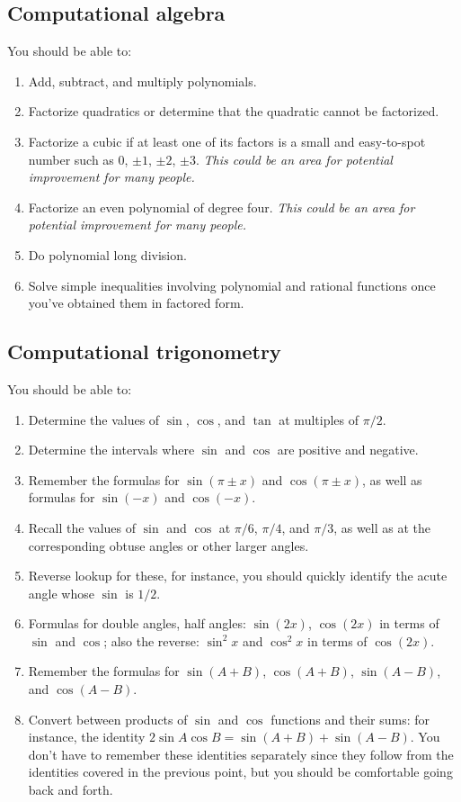 \documentclass[10pt]{amsart}
\begin{document}
\subsection{Computational algebra}

You should be able to:

\begin{enumerate}
\item Add, subtract, and multiply polynomials.
\item Factorize quadratics or determine that the quadratic cannot be
  factorized.
\item Factorize a cubic if at least one of its factors is a small and
  easy-to-spot number such as $0$, $\pm 1$, $\pm 2$, $\pm 3$. {\em
  This could be an area for potential improvement for many people.}
\item Factorize an even polynomial of degree four. {\em This could be
  an area for potential improvement for many people.}
\item Do polynomial long division.
\item Solve simple inequalities involving polynomial and rational
  functions once you've obtained them in factored form.
\end{enumerate}

\subsection{Computational trigonometry}

You should be able to:

\begin{enumerate}
\item Determine the values of $\sin$, $\cos$, and $\tan$ at multiples
  of $\pi/2$.
\item Determine the intervals where $\sin$ and $\cos$ are positive and
  negative.
\item Remember the formulas for $\sin(\pi \pm x )$ and $\cos(\pi \pm x)$,
  as well as formulas for $\sin(-x)$ and $\cos(-x)$.
\item Recall the values of $\sin$ and $\cos$ at $\pi/6$, $\pi/4$, and
  $\pi/3$, as well as at the corresponding obtuse angles or other
  larger angles.
\item Reverse lookup for these, for instance, you should quickly
  identify the acute angle whose $\sin$ is $1/2$.
\item Formulas for double angles, half angles: $\sin(2x)$, $\cos(2x)$
  in terms of $\sin$ and $\cos$; also the reverse: $\sin^2x$ and
  $\cos^2x$ in terms of $\cos(2x)$.
\item Remember the formulas for $\sin(A + B)$, $\cos(A + B)$, $\sin(A
  - B)$, and $\cos(A - B)$.
\item Convert between products of $\sin$ and $\cos$ functions and
  their sums: for instance, the identity $2\sin A \cos B = \sin(A + B)
  + \sin (A - B)$. You don't have to remember these identities
  separately since they follow from the identities covered in the
  previous point, but you should be comfortable going back and forth.
\end{enumerate}
\end{document}
